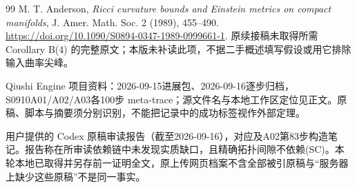 \documentclass[UTF8,a4paper,11pt,fontset=fandol]{ctexart}
\numberwithin{equation}{section}
\theoremstyle{definition}
\begin{document}
\begin{thebibliography}{99}
 M. T. Anderson, \emph{Ricci curvature bounds and Einstein metrics on compact manifolds}, J. Amer. Math. Soc. 2 (1989), 455--490. \url{https://doi.org/10.1090/S0894-0347-1989-0999661-1}. 原续接稿未取得所需 Corollary B(4) 的完整原文；本版未补读此项，不据二手概述填写假设或用它排除输入曲率尖峰。

 Qiushi Engine 项目资料：2026-09-15进展包、2026-09-16逐步归档，S0910A01/A02/A03各100步 meta-trace；源文件名与本地工作区定位见正文。原稿、脚本与摘要须分别识别，不能把记录中的成功标签视作外部定理。

 用户提供的 Codex 原稿审读报告（截至2026-09-16），对应及A02第83步构造笔记。报告称在所审读依赖链中未发现实质缺口，且精确拓扑间隙不依赖(SC)。本轮本地已取得并另存前一证明全文，原上传网页档案不含全部被引原稿与“服务器上缺少这些原稿”不是同一事实。

\end{thebibliography}
\end{document}
